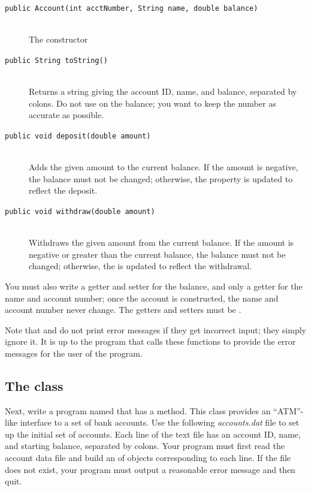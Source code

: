 \begin{exercise}
\begin{description}
    \item[\texttt{public Account(int acctNumber, String name, double balance)}] \hfill \\ The constructor
    \item[\texttt{public String toString()}] \hfill \\  Returns a string giving the account ID, name, and balance, separated by colons. Do not use  on the balance; you want to keep the number as accurate as possible.
    \item[\texttt{public void deposit(double amount)}] \hfill \\  Adds the given amount to the current balance. If the amount is negative, the balance must not be changed; otherwise, the  property is updated to reflect the deposit.
    \item[\texttt{public void withdraw(double amount)}] \hfill \\ Withdraws the given amount from the current balance. If the amount is negative or greater than the current balance, the balance must not be changed; otherwise, the  is updated to reflect the withdrawal.
\end{description}

You must also write a getter and setter for the balance, and only a getter for the name and account number; once the account is constructed, the name and account number never change. The getters and setters must be .

Note that  and  do not print error messages if they get incorrect input; they simply ignore it. It is up to the program that calls these functions to provide the error messages for the user of the program.

\subsection*{The  class}
Next, write a program named  that has a  method. This class provides an ``ATM''-like interface to a set of bank accounts. Use the following {\em accounts.dat} file to set up the initial set of accounts. Each line of the text file has an account ID, name, and starting balance, separated by colons. Your program must first read the account data file and build an  of  objects corresponding to each line. If the file does not exist, your program must output a reasonable error message and then quit.


\end{exercise}
